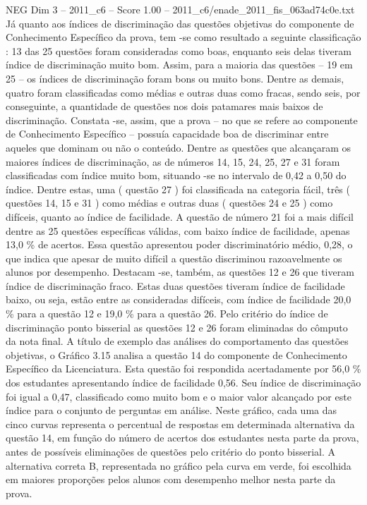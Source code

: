 \begin{textsample}{NEG Dim 3 – 2011\_c6 – Score 1.00 – 2011\_c6/enade\_2011\_fis\_063ad74c0e.txt}
Já quanto aos índices de discriminação das questões objetivas do componente de Conhecimento Específico da prova, tem -se como resultado a seguinte classificação : 13 das 25 questões foram consideradas como boas, enquanto seis delas tiveram índice de discriminação muito bom.
Assim, para a maioria das questões – 19 em 25 – os índices de discriminação foram bons ou muito bons.
Dentre as demais, quatro foram classificadas como médias e outras duas como fracas, sendo seis, por conseguinte, a quantidade de questões nos dois patamares mais baixos de discriminação.
Constata -se, assim, que a prova – no que se refere ao componente de Conhecimento Específico – possuía capacidade boa de discriminar entre aqueles que dominam ou não o conteúdo.
Dentre as questões que alcançaram os maiores índices de discriminação, as de números 14, 15, 24, 25, 27 e 31 foram classificadas com índice muito bom, situando -se no intervalo de 0,42 a 0,50 do índice.
Dentre estas, uma ( questão 27 ) foi classificada na categoria fácil, três ( questões 14, 15 e 31 ) como médias e outras duas ( questões 24 e 25 ) como difíceis, quanto ao índice de facilidade.
A questão de número 21 foi a mais difícil dentre as 25 questões específicas válidas, com baixo índice de facilidade, apenas 13,0 \% de acertos.
Essa questão apresentou poder discriminatório médio, 0,28, o que indica que apesar de muito difícil a questão discriminou razoavelmente os alunos por desempenho.
Destacam -se, também, as questões 12 e 26 que tiveram índice de discriminação fraco.
Estas duas questões tiveram índice de facilidade baixo, ou seja, estão entre as consideradas difíceis, com índice de facilidade 20,0 \% para a questão 12 e 19,0 \% para a questão 26.
Pelo critério do índice de discriminação ponto bisserial as questões 12 e 26 foram eliminadas do cômputo da nota final.
A título de exemplo das análises do comportamento das questões objetivas, o Gráfico 3.15 analisa a questão 14 do componente de Conhecimento Específico da Licenciatura.
Esta questão foi respondida acertadamente por 56,0 \% dos estudantes apresentando índice de facilidade 0,56.
Seu índice de discriminação foi igual a 0,47, classificado como muito bom e o maior valor alcançado por este índice para o conjunto de perguntas em análise.
Neste gráfico, cada uma das cinco curvas representa o percentual de respostas em determinada alternativa da questão 14, em função do número de acertos dos estudantes nesta parte da prova, antes de possíveis eliminações de questões pelo critério do ponto bisserial.
A alternativa correta B, representada no gráfico pela curva em verde, foi escolhida em maiores proporções pelos alunos com desempenho melhor nesta parte da prova.

\end{textsample}
